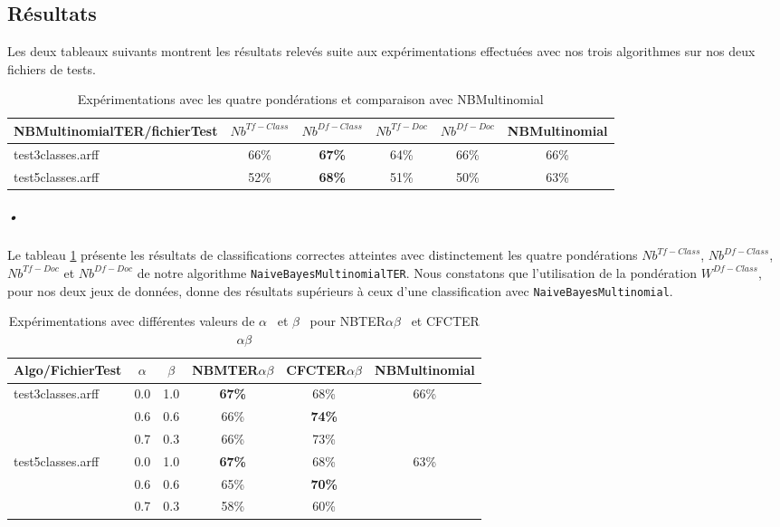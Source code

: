 \documentclass{article}
\begin{document}
\subsection{Résultats}\label{Res}
Les deux tableaux suivants montrent les résultats relevés suite aux expérimentations effectuées avec nos trois algorithmes sur nos deux fichiers de tests.

\begin{table}[h]
\centering
    \begin{tabular}{|l|c|c|c|c||c|}
    \hline
    NBMultinomialTER/fichierTest  & $Nb^{Tf-Class}$ & $Nb^{Df-Class}$& $Nb^{Tf-Doc}$ & $Nb^{Df-Doc}$ & NBMultinomial \\ \hline
    test3classes.arff &   66\% & \textbf{67\%}   & 64\%  & 66\% & 66\%  \\ \hline
    test5classes.arff & 52\%  & \textbf{68\%} & 51\% & 50\% & 63\%  \\ \hline
    \end{tabular}
    \caption {Expérimentations avec les quatre pondérations et comparaison avec NBMultinomial}
 \label{NBTER}
\end{table}
\subparagraph*{•}
Le tableau \ref{NBTER} présente les résultats de classifications correctes atteintes avec distinctement les quatre pondérations $Nb^{Tf-Class}$, $Nb^{Df-Class}$, $Nb^{Tf-Doc}$ et $Nb^{Df-Doc}$ de notre algorithme  \texttt{NaiveBayesMultinomialTER}. Nous constatons que l'utilisation de la pondération $W^{Df-Class}$, pour nos deux jeux de données, donne des résultats supérieurs à ceux d'une classification avec  \texttt{NaiveBayesMultinomial}.
\begin{table}[h]
\centering
    \begin{tabular}{|l|c|c|c|c||c|}
\hline
 Algo/FichierTest & $\alpha$ & $\beta$ & NBMTER$\alpha$$\beta$ & CFCTER$\alpha$$\beta$ & NBMultinomial \\
    \hline
    test3classes.arff &  0.0 &  1.0& \textbf{67\%} & 68\% & 66\% \\
    \cline{2-5}
         ~ &   0.6  &  0.6 & 66\% & \textbf{74\%} & ~\\
         \cline{2-5}
         ~ &   0.7  &  0.3 & 66\% & 73\% & ~\\
    \hline
     test5classes.arff &  0.0 &  1.0& \textbf{67\%} &68\% & 63\% \\
    \cline{2-5}
         ~ &   0.6  &  0.6 & 65\% & \textbf{70\%} & ~\\
         \cline{2-5}
         ~ &   0.7  &  0.3 & 58\% & 60\% & ~\\
    \hline
    \end{tabular}
    \caption {Expérimentations avec différentes valeurs de $\alpha$  \ et $\beta$ \  pour NBTER$\alpha$$\beta$ \ et CFCTER$\alpha$$\beta$ }
 \label{NBab}
\end{table}
\end{document}
